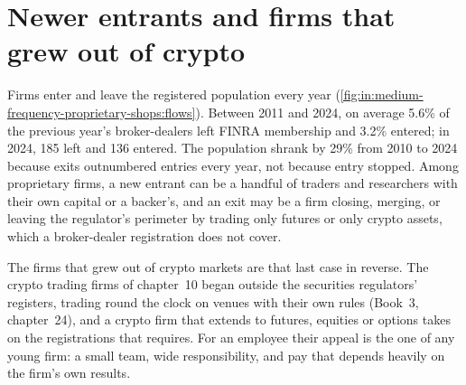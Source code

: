 \begin{omfigure}

\label{fig:in:medium-frequency-proprietary-shops:ccdf}
\end{omfigure}

\section{Newer entrants and firms that grew out of crypto}

Firms enter and leave the registered population every year
(\cref{fig:in:medium-frequency-proprietary-shops:flows}). Between 2011 and 2024, on average 5.6\% of the previous year's
broker-dealers left FINRA membership and 3.2\% entered; in 2024, 185 left and 136 entered. The population
shrank by 29\% from 2010 to 2024 because exits outnumbered entries every year, not because entry stopped. Among
proprietary firms, a new entrant can be a handful of traders and researchers with their own capital or a backer's,
and an exit may be a firm closing, merging, or leaving the regulator's perimeter by trading only futures or only crypto
assets, which a broker-dealer registration does not cover.

The firms that grew out of crypto markets are that last case in reverse. The crypto trading firms of chapter~10 began
outside the securities regulators' registers, trading round the clock on venues with their own rules (Book~3, chapter~24),
and a crypto firm that extends to futures,
equities or options takes on the registrations that requires. For an employee
their appeal is the one of any young firm: a small team, wide responsibility, and pay that depends heavily on the
firm's own results.

